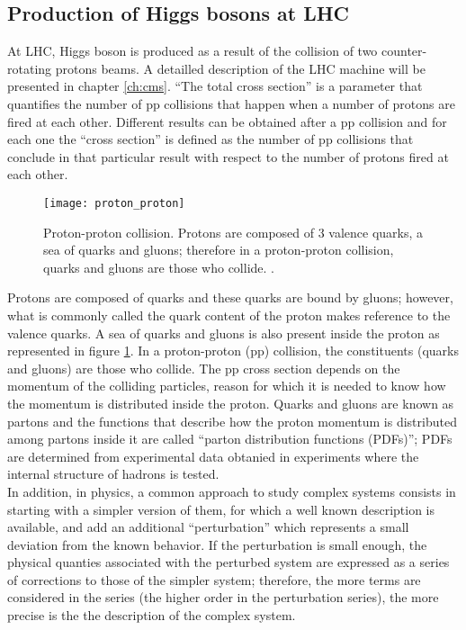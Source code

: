 \subsection{Production of Higgs bosons at LHC}

\noindent At LHC, Higgs boson is produced as a result of the collision of two counter-rotating protons beams. A detailled description of the LHC machine will be presented in chapter \ref{ch:cms}. ``The total cross section'' is a parameter that quantifies the number of pp collisions that happen when a number of protons are fired at each other. Different results can be obtained after a pp collision and for each one the ``cross section'' is defined as the number of pp collisions that conclude in that particular result with respect to the number of protons fired at each other.
\begin{figure}[!h]
\centering
\texttt{[image: proton\_proton]}
\caption[Proton-Proton collision]{Proton-proton collision. Protons are composed of 3 valence quarks, a sea of quarks and gluons; therefore in a proton-proton collision, quarks and gluons are those who collide. \cite{pp_coll}.}
\label{pp_collision}
\end{figure}

\noindent Protons are composed of quarks and these quarks are bound by gluons; however, what is commonly called the quark content of the proton makes reference to the valence quarks. A sea of quarks and gluons is also present inside the proton as represented in figure \ref{pp_collision}. In a proton-proton (pp) collision, the constituents (quarks and gluons) are those who collide. The pp cross section depends on the momentum of the colliding particles, reason for which it is needed to know how the momentum is distributed inside the proton. Quarks and gluons are known as partons and the functions that describe how the proton momentum is distributed among partons inside it are called ``parton distribution functions (PDFs)''; PDFs are determined from experimental data obtanied in experiments where the internal structure of hadrons is tested.\\

\noindent In addition, in physics, a common approach to study complex systems consists in starting with a simpler version of them, for which a well known description is available, and add an additional ``perturbation'' which represents a small deviation from the known behavior. If the perturbation is small enough, the physical quanties associated with the perturbed system are expressed as a series of corrections to those of the simpler system; therefore, the more terms are considered in the series (the higher order in the perturbation series), the more precise is the the description of the complex system.\\

